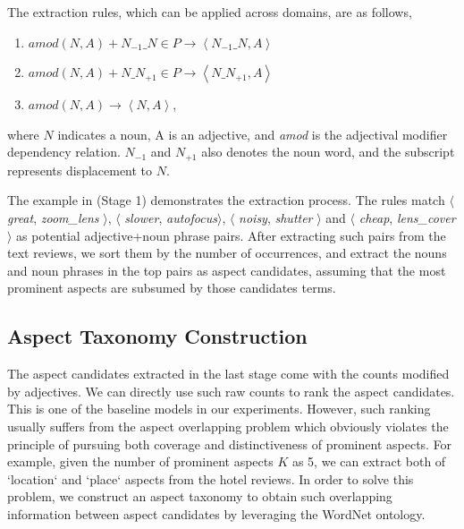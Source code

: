 The extraction rules, which can be applied across domains, are as follows,
\begin{enumerate}
	\item $amod(N, A) + N_{-1}\_N \in P \rightarrow \left\langle N_{-1}\_N, A\right\rangle$
	\item $amod(N, A) + N\_N_{+1} \in P \rightarrow \left\langle N\_N_{+1}, A\right\rangle$
	\item $amod(N, A) \rightarrow \left\langle N, A\right\rangle$,
\end{enumerate}
where $N$ indicates a noun, A is an adjective, and \emph{amod} is the 
adjectival modifier dependency relation.
$N_{-1}$ and $N_{+1}$ also denotes the noun word, 
and the subscript represents displacement to $N$.
 
The example in  (Stage 1) demonstrates the 
extraction process. 
The rules match $\langle$ \emph{great}, \emph{zoom\_lens }$\rangle$,  
 $\langle$  \emph{slower}, \emph{autofocus}$ \rangle$, 
 $\langle$ \emph{noisy}, \emph{shutter} $\rangle$ and $\langle$ \emph{cheap}, \emph{lens\_cover} $\rangle$ as potential adjective+noun phrase pairs.
After extracting such pairs from the text reviews, 
we sort them by the number of occurrences,
and extract the nouns and noun phrases in the top pairs
as aspect candidates, assuming that
the most prominent aspects are subsumed by those candidates 
terms. 

% 


\subsection{Aspect Taxonomy Construction}
\label{sec:taxonomy}
The aspect candidates extracted in the last stage come with the counts 
modified by adjectives. We can directly use such raw counts to rank 
the aspect candidates. This is one of the baseline models in 
our experiments.
However, such ranking usually suffers from the aspect overlapping problem
which obviously violates the principle of pursuing both coverage and 
distinctiveness of prominent aspects.
For example, given the number of prominent aspects 
$K$ as 5,
we can extract both of `location` and `place` aspects from
the hotel reviews. 
In order to solve this problem, we construct an aspect taxonomy 
to obtain such overlapping information between aspect candidates by
leveraging the WordNet ontology. 

